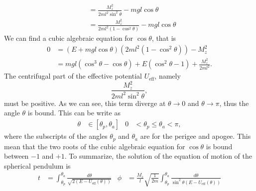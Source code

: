 \begin{problem}
{\begin{align*}
    &= \frac{M_z^2}{2ml^2\sin^2{\theta}} - mgl\cos{\theta} \\
    &= \frac{M_z^2}{2ml^2\left(1-\cos^2{\theta}\right)} - mgl\cos{\theta}
\end{align*}
We can find a cubic algebraic equation for $\cos{\theta}$, that is
\begin{align*}
    0 &= \left( E + mgl\cos{\theta} \right) \left( 2ml^2 \left( 1 - \cos^2{\theta} \right) \right) - M_z^2 \\
      &= mgl\left(\cos^3{\theta} - \cos{\theta}\right) + E\left(\cos^2{\theta} - 1\right) + \frac{M_z^2}{2ml^2} .
\end{align*}
The centrifugal part of the effective potential $U_{\text{eff}}$, namely
\begin{equation*}
    \frac{M_z^2}{2ml^2\sin^2{\theta}},
\end{equation*}
must be positive. As we can see, this term diverge at $\theta \rightarrow 0$ and $\theta \rightarrow \pi$, thus the angle $\theta$ is bound. This can be write as
\begin{align*}
  \theta &\in \left[ \theta_p, \theta_a\right] & 0 &< \theta_p \leq \theta_a < \pi,
\end{align*}
where the subscripts of the angles $\theta_p$ and $\theta_a$ are for the perigee and apogee. This mean that the two roots of the cubic algebraic equation for $\cos{\theta}$ is bound between $-1$ and $+1$. To summarize, the solution of the equation of motion of the spherical pendulum is
}
{
\begin{align*}
  t &= \int_{\theta_p}^{\theta_a} \frac{d\theta}{\sqrt{2\left( E - U_{\text{eff}}(\theta) \right)}} & \phi &= \frac{M_z}{l}\sqrt{\frac{1}{2m}}\int_{\theta_p}^{\theta_a}\frac{d\theta}{\sin^2{\theta}\left( E - U_{\text{eff}}(\theta) \right)}
\end{align*}
}
\end{problem}


